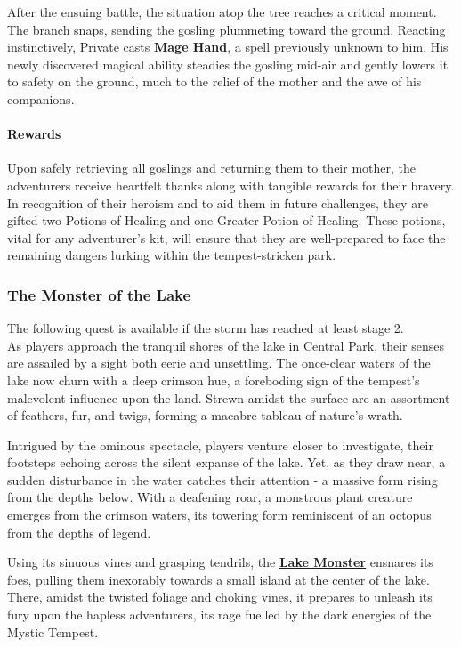 After the ensuing battle, the situation atop the tree reaches a critical moment. The branch snaps, sending the gosling plummeting toward the ground. Reacting instinctively, Private casts \textbf{Mage Hand}, a spell previously unknown to him. His newly discovered magical ability steadies the gosling mid-air and gently lowers it to safety on the ground, much to the relief of the mother and the awe of his companions.

\paragraph*{Rewards}
Upon safely retrieving all goslings and returning them to their mother, the adventurers receive heartfelt thanks along with tangible rewards for their bravery. In recognition of their heroism and to aid them in future challenges, they are gifted two Potions of Healing and one Greater Potion of Healing. These potions, vital for any adventurer's kit, will ensure that they are well-prepared to face the remaining dangers lurking within the tempest-stricken park.

\subsubsection*{The Monster of the Lake}
The following quest is available if the storm has reached at least stage 2.\\
As players approach the tranquil shores of the lake in Central Park, their senses are assailed by a sight both eerie and unsettling. The once-clear waters of the lake now churn with a deep crimson hue, a foreboding sign of the tempest's malevolent influence upon the land. Strewn amidst the surface are an assortment of feathers, fur, and twigs, forming a macabre tableau of nature's wrath.

Intrigued by the ominous spectacle, players venture closer to investigate, their footsteps echoing across the silent expanse of the lake. Yet, as they draw near, a sudden disturbance in the water catches their attention - a massive form rising from the depths below. With a deafening roar, a monstrous plant creature emerges from the crimson waters, its towering form reminiscent of an octopus from the depths of legend.

Using its sinuous vines and grasping tendrils, the \hyperref[sec:LakeMonster]{\textbf{Lake Monster}} ensnares its foes, pulling them inexorably towards a small island at the center of the lake. There, amidst the twisted foliage and choking vines, it prepares to unleash its fury upon the hapless adventurers, its rage fuelled by the dark energies of the Mystic Tempest.

